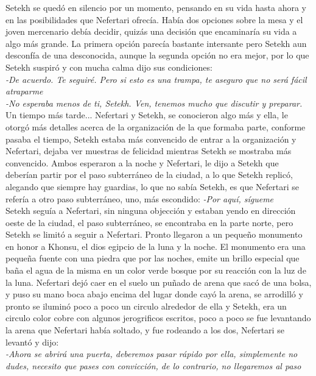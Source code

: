 Setekh se quedó en silencio por un momento, pensando en su vida hasta ahora y en las posibilidades que Nefertari ofrecía. Había dos opciones sobre la mesa y el joven mercenario debía decidir, quizás una decisión que encaminaría su vida a algo más grande. La primera opción parecía bastante intersante pero Setekh aun desconfía de una desconocida, aunque la segunda opción no era mejor, por lo que Setekh suspiró y con mucha calma dijo sus condiciones:\\
\textit{-De acuerdo. Te seguiré. Pero si esto es una trampa, te aseguro que no será fácil atraparme}\\
\textit{-No esperaba menos de ti, Setekh. Ven, tenemos mucho que discutir y preparar.}\\

\clearpage 
Un tiempo más tarde...
Nefertari y Setekh, se conocieron algo más y ella, le otorgó más detalles acerca de la organización de la que formaba parte, conforme pasaba el tiempo, Setekh estaba más convencido de entrar a la organización y Nefertari, dejaba ver muestras de felicidad mientras Setekh se mostraba más convencido. Ambos esperaron a la noche y Nefertari, le dijo a Setekh que deberían partir por el paso subterráneo de la ciudad, a lo que Setekh replicó, alegando que siempre hay guardias, lo que no sabía Setekh,
es que Nefertari se refería a otro paso subterráneo, uno, más escondido:
\textit{-Por aquí, sígueme}\\
Setekh seguía a Nefertari, sin ninguna objección y estaban yendo en dirección oeste de la ciudad, el paso subterráneo, se encontraba en la parte norte, pero Setekh se limitó a seguir a Nefertari. Pronto llegaron a un pequeño monumento en honor a Khonsu, el dios egipcio de la luna y la noche. El monumento era una pequeña fuente con una piedra que por las noches, emite un brillo especial que baña el agua de la misma en un color verde bosque por su reacción con la luz de la luna. Nefertari dejó caer en el suelo un puñado de arena que sacó de una bolsa, y puso su mano boca abajo encima del lugar donde cayó la arena, se arrodilló y pronto se iluminó poco a poco un circulo alrededor de ella y Setekh, era un circulo color cobre con algunos jerogrificos
escritos, poco a poco se fue levantando la arena que Nefertari había soltado, y fue rodeando a los dos, Nefertari se levantó y dijo:\\
\textit{-Ahora se abrirá una puerta, deberemos pasar rápido por ella, simplemente no dudes, necesito que pases con convicción, de lo contrario, no llegaremos al paso}\\
